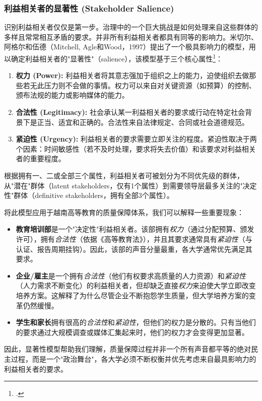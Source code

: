 \subsubsection{利益相关者的显著性 (Stakeholder Salience)}

识别利益相关者仅仅是第一步。治理中的一个巨大挑战是如何处理来自这些群体的多样且常常相互矛盾的要求。并非所有利益相关者都具有同等的影响力。米切尔、阿格尔和伍德（Mitchell, Agle和Wood，1997）提出了一个极具影响力的模型，用以确定利益相关者的"显著性"（salience），该模型基于三个核心属性\footcite{Mitchell1997}：

\begin{enumerate}
    \item \textbf{权力 (Power):} 利益相关者将其意志强加于组织之上的能力，迫使组织去做那些若无此压力则不会做的事情。权力可以来自对关键资源（如预算）的控制、颁布法规的能力或影响媒体的能力。
    \item \textbf{合法性 (Legitimacy):} 社会承认某一利益相关者的要求或行动在特定社会背景下是正当、适宜和正确的。合法性来自法律规定、合同或社会道德规范。
    \item \textbf{紧迫性 (Urgency):} 利益相关者的要求需要立即关注的程度。紧迫性取决于两个因素：时间敏感性（若不及时处理，要求将失去价值）和该要求对利益相关者的重要程度。
\end{enumerate}

根据拥有一、二或全部三个属性，利益相关者可被划分为不同优先级的群体，从"潜在"群体（latent stakeholders，仅有1个属性）到需要领导层最多关注的"决定性"群体（definitive stakeholders，拥有全部3个属性）。

将此模型应用于越南高等教育的质量保障体系，我们可以解释一些重要现象：
\begin{itemize}
    \item \textbf{教育培训部}是一个"决定性"利益相关者。该部拥有\textit{权力}（通过分配预算、颁发许可），拥有\textit{合法性}（依据《高等教育法》），并且其要求通常具有\textit{紧迫性}（与认证、报告周期挂钩）。因此，该部的声音分量最重，各大学通常优先满足其要求。
    \item \textbf{企业/雇主}是一个拥有\textit{合法性}（他们有权要求高质量的人力资源）和\textit{紧迫性}（人力需求不断变化）的利益相关者，但却缺乏直接\textit{权力}来迫使大学立即改变培养方案。这解释了为什么尽管企业不断抱怨学生质量，但大学培养方案的变革仍然缓慢。
    \item \textbf{学生和家长}拥有很高的\textit{合法性}和\textit{紧迫性}，但他们的权力是分散的。只有当他们的要求通过大规模调查或媒体汇集起来时，他们的权力才会变得更加显著。
\end{itemize}
因此，显著性模型帮助我们理解，质量保障过程并非一个所有声音都平等的绝对民主过程，而是一个"政治舞台"，各大学必须不断权衡并优先考虑来自最具影响力的利益相关者的要求。

